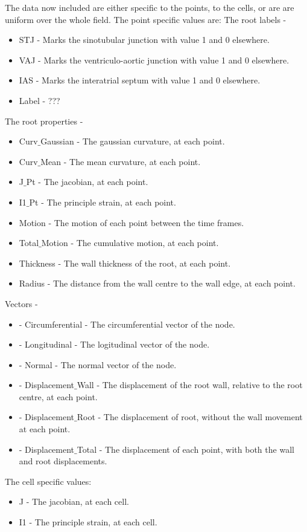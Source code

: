 \documentclass{article}
\begin{document}
The data now included are either specific to the points, to the cells, or are are uniform over the whole field.
The point specific values are:
The root labels - 
\begin{itemize}
    \item STJ - Marks the sinotubular junction with value 1 and 0 elsewhere.
    \item VAJ - Marks the ventriculo-aortic junction with value 1 and 0 elsewhere.
    \item IAS - Marks the interatrial septum with value 1 and 0 elsewhere.
    \item Label - ???
\end{itemize}
The root properties - 
\begin{itemize}
    \item Curv$\_$Gaussian - The gaussian curvature, at each point.
    \item Curv$\_$Mean - The mean curvature, at each point.
    \item J$\_$Pt - The jacobian, at each point.
    \item I1$\_$Pt - The principle strain, at each point.
    \item Motion - The motion of each point between the time frames.
    \item Total$\_$Motion - The cumulative motion, at each point. 
    \item Thickness - The wall thickness of the root, at each point.
    \item Radius - The distance from the wall centre to the wall edge, at each point.
\end{itemize}
Vectors - 
\begin{itemize}
    \item - Circumferential - The circumferential vector of the node.
    \item - Longitudinal - The logitudinal vector of the node.
    \item - Normal - The normal vector of the node.
    \item - Displacement$\_$Wall - The displacement of the root wall, relative to the root centre, at each point.
    \item - Displacement$\_$Root - The displacement of root, without the wall movement at each point.
    \item - Displacement$\_$Total - The displacement of each point, with both the wall and root displacements.
\end{itemize}
The cell specific values:
\begin{itemize}
    \item J - The jacobian, at each cell.
    \item I1 - The principle strain, at each cell.
\end{itemize}
\end{document}
